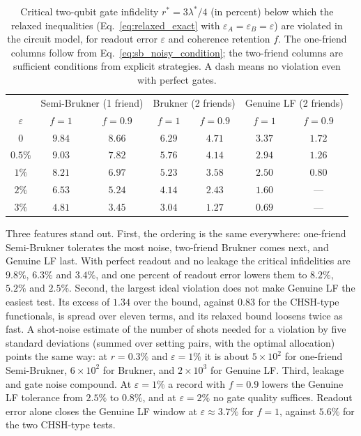 \begin{table}[t]
\caption{Critical two-qubit gate infidelity $r^\ast = 3\lambda^\ast/4$ (in percent) below which the relaxed inequalities (Eq.~\eqref{eq:relaxed_exact} with $\varepsilon_A = \varepsilon_B = \varepsilon$) are violated in the circuit model, for readout error $\varepsilon$ and coherence retention $f$. The one-friend columns follow from Eq.~\eqref{eq:sb_noisy_condition}; the two-friend columns are sufficient conditions from explicit strategies. A dash means no violation even with perfect gates.}
\label{tab:noise_budget}
\begin{ruledtabular}
\begin{tabular}{ccccccc}
 & \multicolumn{2}{c}{Semi-Brukner (1 friend)} & \multicolumn{2}{c}{Brukner (2 friends)} & \multicolumn{2}{c}{Genuine LF (2 friends)} \\
$\varepsilon$ & $f = 1$ & $f = 0.9$ & $f = 1$ & $f = 0.9$ & $f = 1$ & $f = 0.9$ \\
\colrule
$0$     & $9.84$ & $8.66$ & $6.29$ & $4.71$ & $3.37$ & $1.72$ \\
$0.5\%$ & $9.03$ & $7.82$ & $5.76$ & $4.14$ & $2.94$ & $1.26$ \\
$1\%$   & $8.21$ & $6.97$ & $5.23$ & $3.58$ & $2.50$ & $0.80$ \\
$2\%$   & $6.53$ & $5.24$ & $4.14$ & $2.43$ & $1.60$ & --- \\
$3\%$   & $4.81$ & $3.45$ & $3.04$ & $1.27$ & $0.69$ & --- \\
\end{tabular}
\end{ruledtabular}
\end{table}

Three features stand out. First, the ordering is the same everywhere: one-friend Semi-Brukner tolerates the most noise, two-friend Brukner comes next, and Genuine LF last. With perfect readout and no leakage the critical infidelities are $9.8\%$, $6.3\%$ and $3.4\%$, and one percent of readout error lowers them to $8.2\%$, $5.2\%$ and $2.5\%$. Second, the largest ideal violation does not make Genuine LF the easiest test. Its excess of $1.34$ over the bound, against $0.83$ for the CHSH-type functionals, is spread over eleven terms, and its relaxed bound loosens twice as fast. A shot-noise estimate of the number of shots needed for a violation by five standard deviations (summed over setting pairs, with the optimal allocation) points the same way: at $r = 0.3\%$ and $\varepsilon = 1\%$ it is about $5 \times 10^2$ for one-friend Semi-Brukner, $6 \times 10^2$ for Brukner, and $2 \times 10^3$ for Genuine LF. Third, leakage and gate noise compound. At $\varepsilon = 1\%$ a record with $f = 0.9$ lowers the Genuine LF tolerance from $2.5\%$ to $0.8\%$, and at $\varepsilon = 2\%$ no gate quality suffices. Readout error alone closes the Genuine LF window at $\varepsilon \approx 3.7\%$ for $f = 1$, against $5.6\%$ for the two CHSH-type tests.


